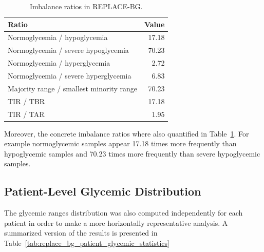 \begin{table}[htbp]
    \centering
    \caption{Imbalance ratios in REPLACE-BG.}
    \label{tab:replace_bg_imbalance_ratios}
    \begin{tabular}{lr}
        \hline
        \textbf{Ratio} & \textbf{Value} \\
        \hline
        Normoglycemia / hypoglycemia & 17.18 \\
        Normoglycemia / severe hypoglycemia & 70.23 \\
        Normoglycemia / hyperglycemia & 2.72 \\
        Normoglycemia / severe hyperglycemia & 6.83 \\
        Majority range / smallest minority range & 70.23 \\
        \hline
        TIR / TBR & 17.18 \\
        TIR / TAR & 1.95 \\
        \hline
    \end{tabular}
\end{table}

Moreover, the concrete imbalance ratios where also quantified in Table~\ref{tab:replace_bg_imbalance_ratios}. For example normoglycemic samples appear 17.18 times more frequently than hypoglycemic samples and 70.23 times more frequently than severe hypoglycemic samples.

\subsection{Patient-Level Glycemic Distribution}
\label{subsec:replacebg_patient_level}

The glycemic ranges distribution was also computed independently for each patient in order to make a more horizontally representative analysis. A summarized version of the results is presented in Table~\ref{tab:replace_bg_patient_glycemic_statistics}

